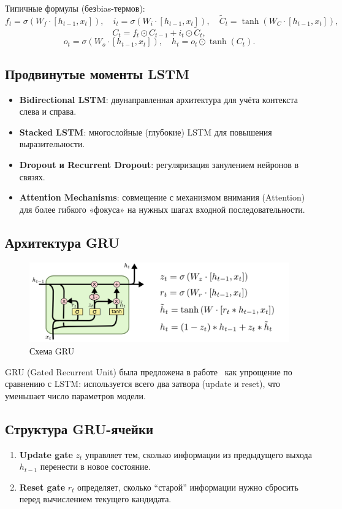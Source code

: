 Типичные формулы (безbias-термов):
\[
f_t = \sigma(W_f \cdot [h_{t-1}, x_t]), \quad
i_t = \sigma(W_i \cdot [h_{t-1}, x_t]), \quad
\tilde{C}_t = \tanh(W_C \cdot [h_{t-1}, x_t]),
\]
\[
C_t = f_t \odot C_{t-1} + i_t \odot \tilde{C}_t,
\]
\[
o_t = \sigma(W_o \cdot [h_{t-1}, x_t]), \quad
h_t = o_t \odot \tanh(C_t).
\]

\subsection{Продвинутые моменты LSTM}
\begin{itemize}
    \item \textbf{Bidirectional LSTM}: двунаправленная архитектура для учёта контекста слева и справа.
    \item \textbf{Stacked LSTM}: многослойные (глубокие) LSTM для повышения выразительности.
    \item \textbf{Dropout и Recurrent Dropout}: регуляризация занулением нейронов в связях.
    \item \textbf{Attention Mechanisms}: совмещение с механизмом внимания (Attention) для более гибкого «фокуса» на нужных шагах входной последовательности.
\end{itemize}

\subsection{Архитектура GRU}

\begin{figure}[h]
	\centering
	\includegraphics[width=0.6\linewidth]{chapters/neural/images/gru.png}
	\caption{Схема GRU}
	\label{img:gru}
\end{figure}
GRU (Gated Recurrent Unit) была предложена в работе~\cite{cho2014properties} как упрощение по сравнению с LSTM: используется всего два затвора (update и reset), что уменьшает число параметров модели.

\subsection{Структура GRU-ячейки}
\begin{enumerate}
    \item \textbf{Update gate} $z_t$ управляет тем, сколько информации из предыдущего выхода $h_{t-1}$ перенести в новое состояние.
    \item \textbf{Reset gate} $r_t$ определяет, сколько ``старой'' информации нужно сбросить перед вычислением текущего кандидата.
\end{enumerate}

